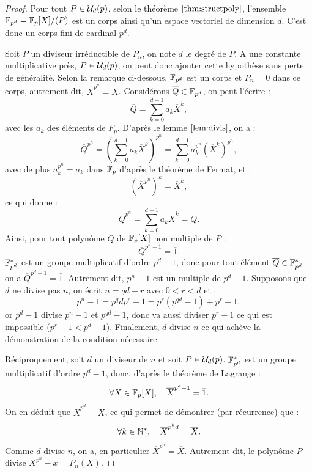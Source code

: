 \begin{proof}
Pour tout $P \in \mathcal{U}_d(p)$, selon le théorème $\ref{thm:structpoly}$, l'ensemble $\mathbb{F}_{p^d} = \mathbb{F}_p[X]/(P)$ est un corps 
ainsi qu'un espace vectoriel de dimension $d$. C'est donc un corps fini de cardinal $p^d$. \newline

Soit $P$ un diviseur irréductible de $P_n$, on note $d$ le degré de $P$. A une constante multiplicative près, $P \in \mathcal{U}_d(p)$,
on peut donc ajouter cette hypothèse sans perte de généralité. 
Selon la remarque ci-dessous, $\mathbb{F}_{p^d}$ est un corps et $\overline{P_n} = \overline{0}$ dans ce corps, autrement dit, 
$\overline{X}^{p^n} = \overline{X}$. 
Considérons $\overline{Q} \in \mathbb{F}_{p^d}$, on peut l'écrire :
\[ \overline{Q} = \sum_{k=0}^{d-1} a_k \overline{X}^k , \]
avec les $a_k$ des éléments de $F_p$. D'après le lemme $\ref{lem:divis}$, on a :
\[ \overline{Q}^{p^n} = \left ( \sum_{k=0}^{d-1} a_k \overline{X}^k \right )^{p^n} 
= \sum_{k=0}^{d-1} a_k^{p^n} \left ( \overline{X}^k \right )^{p^n} , \]
avec de plus $a_k^{p^n} = a_k$ dans $\mathbb{F}_p$ d'après le théorème de Fermat, et :
\[ \left ( \overline{X}^{p^n} \right )^k = \overline{X}^k , \]
ce qui donne :
\[ \overline{Q}^{p^n} = \sum_{k=0}^{d-1} a_k \overline{X}^k = \overline{Q} . \]
Ainsi, pour tout polynôme $Q$ de $\mathbb{F}_p[X]$ non multiple de $P$ :
\[ \overline{Q}^{p^n-1} = \overline{1} . \]
$\mathbb{F}_{p^d}^{\ast}$ est un groupe multiplicatif d'ordre $p^d-1$, donc pour tout élément $\overline{Q} \in \mathbb{F}_{p^d}^{\ast}$ on a 
$\overline{Q}^{p^d-1} = \overline{1}$. Autrement dit, $p^n-1$ est un multiple de $p^d-1$.
Supposons que $d$ ne divise pas $n$, on écrit $n=qd + r$ avec $0<r<d$ et :
\[ p^n-1 = p^qd p^r -1 = p^r ( p^{qd} - 1) + p^r - 1 , \]
or $p^d - 1$ divise $p^n -1$ et $p^{qd}-1$, donc va aussi diviser $p^r-1$ ce qui est impossible ($p^r-1 < p^d-1$).
Finalement, $d$ divise $n$ ce qui achève la démonstration de la condition nécessaire.

Réciproquement, soit $d$ un diviseur de $n$ et soit $P \in \mathcal{U}_d(p)$. 
$\mathbb{F}_{p^d}^{\ast}$ est un groupe multiplicatif d'ordre $p^d-1$,  donc, d'après le théorème de Lagrange :
\[ \forall X \in \mathbb{F}_p[X], \quad \overline{X}^{p^d-1} = \overline{1} . \]
On en déduit que $\overline{X}^{p^d} = \overline{X}$, ce qui permet de démontrer (par récurrence) que :
\[ \forall k \in \mathbb{N}^\ast, \quad \overline{X}^{p^kd} = \overline{X} . \]
Comme $d$ divise $n$, on a, en particulier $\overline{X}^{p^n} = \overline{X}$. 
Autrement dit, le polynôme $P$ divise $X^{p^n} - x = P_n(X)$.
\end{proof}

